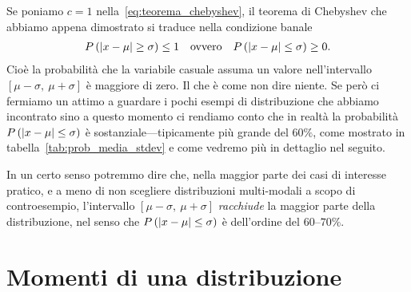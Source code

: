 Se poniamo $c = 1$ nella~\eqref{eq:teorema_chebyshev}, il teorema di Chebyshev
che abbiamo appena dimostrato si traduce nella condizione banale
\begin{align*}
  \displaystyle P\left(\left| x - \mu \right| \ge \sigma\right) \le 1 \quad \text{ovvero} \quad
  \displaystyle P\left(\left| x - \mu \right| \le \sigma\right) \ge 0.
\end{align*}
Cioè la probabilità che la variabile casuale assuma un valore
nell'intervallo $[\mu-\sigma,~\mu+\sigma]$ è maggiore di zero. Il che è
come non dire niente. Se però ci fermiamo un attimo a guardare i pochi
esempi di distribuzione che abbiamo incontrato sino a questo momento ci
rendiamo conto che in realtà la probabilità
$\displaystyle P\left(\left| x - \mu \right| \le \sigma\right)$ è sostanziale---tipicamente più grande
del $60\%$, come mostrato in tabella~\ref{tab:prob_media_stdev} e come
vedremo più in dettaglio nel seguito.

\begin{table}[htbp]
\end{table}

In un certo senso potremmo dire che, nella maggior parte dei casi di interesse
pratico, e a meno di non scegliere distribuzioni multi-modali a scopo di
controesempio, l'intervallo $[\mu-\sigma,~\mu+\sigma]$ \emph{racchiude} la
maggior parte della distribuzione, nel senso che
$\displaystyle P\left(\left| x - \mu \right| \le \sigma\right)$ è dell'ordine del $60$--$70\%$.


\section{Momenti di una distribuzione}

